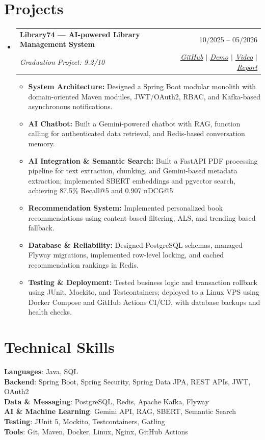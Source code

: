 \documentclass[letterpaper,11pt]{article}
\makeatletter
\newcommand{\resumeItem}[1]{
  \item\small{
    {#1 \vspace{0pt}}
  }
}
\newcommand{\resumeSubheading}[4]{
  \vspace{-2pt}\item
    \begin{tabular*}{0.97\textwidth}[t]{l@{\extracolsep{\fill}}r}
      \textbf{#1} & #2 \\
      \textit{\small#3} & \textit{\small #4} \\
    \end{tabular*}\vspace{-7pt}
}
\newcommand{\resumeSubHeadingListStart}{\begin{itemize}[leftmargin=0.15in, label={}]}
\newcommand{\resumeSubHeadingListEnd}{\end{itemize}}
\newcommand{\resumeItemListStart}{\begin{itemize}[resumeBulletSpacing]}
\newcommand{\resumeItemListEnd}{\end{itemize}\vspace{-5pt}}
\makeatother
\begin{document}
\section{Projects}
    \resumeSubHeadingListStart
      \resumeSubheading
          {\small Library74 --- AI-powered Library Management System}{10/2025 -- 05/2026}
          {Graduation Project: 9.2/10}
          {\href{https://github.com/quangthangk4/LMS}{\faIcon{github}\enspace\underline{GitHub}} $|$ \href{https://library74.uk}{\faIcon{external-link-alt}\enspace\underline{Demo}} $|$ \href{https://drive.google.com/file/d/1kLyZxIl-N-lXxeKscAIFC4zLD_yzk7ng/view?usp=sharing}{\faIcon{play-circle}\enspace\underline{Video}} $|$ \href{https://drive.google.com/file/d/1waUzJBUj230gCykyno_ewdixoRylv9dE/view?usp=sharing}{\faIcon{file-pdf}\enspace\underline{Report}}}
          \resumeItemListStart
            \resumeItem{\textbf{System Architecture:} Designed a Spring Boot modular monolith with domain-oriented Maven modules, JWT/OAuth2, RBAC, and Kafka-based asynchronous notifications.}
            \resumeItem{\textbf{AI Chatbot:} Built a Gemini-powered chatbot with RAG, function calling for authenticated data retrieval, and Redis-based conversation memory.}
            \resumeItem{\textbf{AI Integration \& Semantic Search:} Built a FastAPI PDF processing pipeline for text extraction, chunking, and Gemini-based metadata extraction; implemented SBERT embeddings and pgvector search, achieving 87.5\% Recall@5 and 0.907 nDCG@5.}
            \resumeItem{\textbf{Recommendation System:} Implemented personalized book recommendations using content-based filtering, ALS, and trending-based fallback.}
            \resumeItem{\textbf{Database \& Reliability:} Designed PostgreSQL schemas, managed Flyway migrations, implemented row-level locking, and cached recommendation rankings in Redis.}
            \resumeItem{\textbf{Testing \& Deployment:} Tested business logic and transaction rollback using JUnit, Mockito, and Testcontainers; deployed to a Linux VPS using Docker Compose and GitHub Actions CI/CD, with database backups and health checks.}
          \resumeItemListEnd
    \resumeSubHeadingListEnd


\section{Technical Skills}
 \begin{itemize}[leftmargin=0.15in, label={}]
    \small{\item{
     \textbf{Languages}{: Java, SQL} \\
     \textbf{Backend}{: Spring Boot, Spring Security, Spring Data JPA, REST APIs, JWT, OAuth2} \\
     \textbf{Data \& Messaging}{: PostgreSQL, Redis, Apache Kafka, Flyway} \\
     \textbf{AI \& Machine Learning}{: Gemini API, RAG, SBERT, Semantic Search} \\
     \textbf{Testing}{: JUnit 5, Mockito, Testcontainers, Gatling} \\
     \textbf{Tools}{: Git, Maven, Docker, Linux, Nginx, GitHub Actions}
    }}
 \end{itemize}


\end{document}
